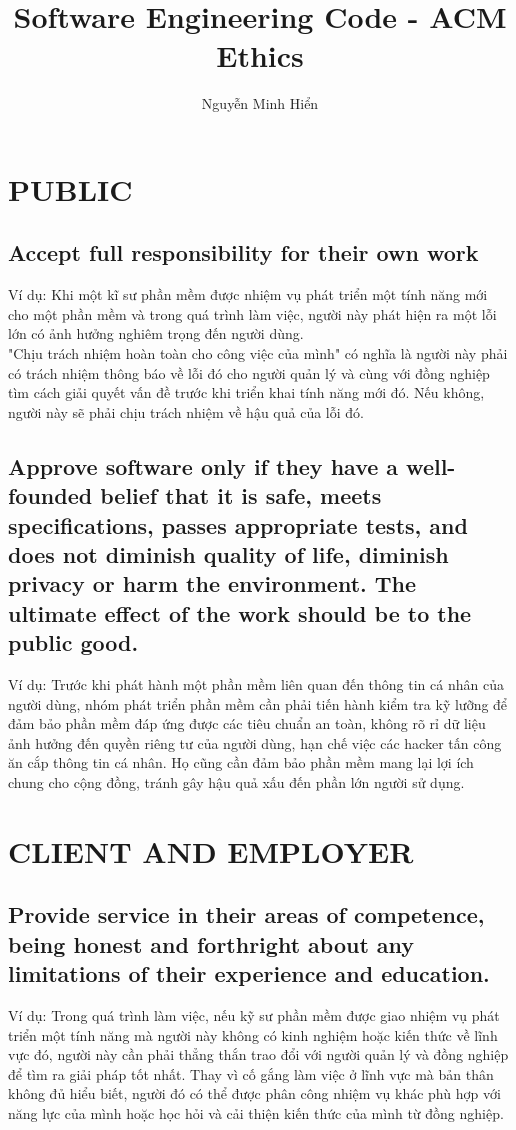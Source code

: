\documentclass[14pt]{extarticle}
\title{Software Engineering Code - ACM Ethics}
\author{Nguyễn Minh Hiển}
\begin{document}
\newpage
\maketitle
\tableofcontents
\newpage

\section{PUBLIC}
\subsection{Accept full responsibility for their own work}
Ví dụ: Khi một kĩ sư phần mềm được nhiệm vụ phát triển một tính
năng mới cho một phần mềm và trong quá trình làm việc, người này phát
hiện ra một lỗi lớn có ảnh hưởng nghiêm trọng đến người dùng. \\
"Chịu trách nhiệm hoàn toàn cho công việc của mình" có nghĩa là người này
phải có trách nhiệm thông báo về lỗi đó cho người quản lý và 
cùng với đồng nghiệp tìm cách giải quyết vấn đề trước khi triển khai 
tính năng mới đó. Nếu không, người này sẽ phải chịu trách nhiệm 
về hậu quả của lỗi đó.

\setcounter{subsection}{2}
\subsection{Approve software only if they have a well-founded 
belief that it is safe, meets specifications, passes appropriate 
tests, and does not diminish quality of life, diminish privacy or 
harm the environment. The ultimate effect of the work should be to 
the public good.}
Ví dụ: Trước khi phát hành một phần mềm liên quan đến thông tin 
cá nhân của người dùng, nhóm phát triển phần mềm cần phải tiến 
hành kiểm tra kỹ lưỡng để đảm bảo phần mềm đáp ứng được các tiêu chuẩn
an toàn, không rõ rỉ dữ liệu ảnh hưởng đến quyền riêng tư của người 
dùng, hạn chế việc các hacker tấn công ăn cắp thông tin cá nhân. Họ
cũng cần đảm bảo phần mềm mang lại lợi ích chung cho cộng đồng, tránh
gây hậu quả xấu đến phần lớn người sử dụng.

\section{CLIENT AND EMPLOYER}
\subsection{Provide service in their areas of competence, being 
honest and forthright about any limitations of their experience 
and education.}
Ví dụ: Trong quá trình làm việc, nếu kỹ sư phần mềm được giao nhiệm vụ
phát triển một tính năng mà người này không có kinh nghiệm hoặc kiến thức
về lĩnh vực đó, người này cần phải thẳng thắn trao đổi với người 
quản lý và đồng nghiệp để tìm ra giải pháp tốt nhất. Thay vì cố gắng
làm việc ở lĩnh vực mà bản thân không đủ hiểu biết, người đó có thể
được phân công nhiệm vụ khác phù hợp với năng lực của mình hoặc
học hỏi và cải thiện kiến thức của mình từ đồng nghiệp.
\end{document}
